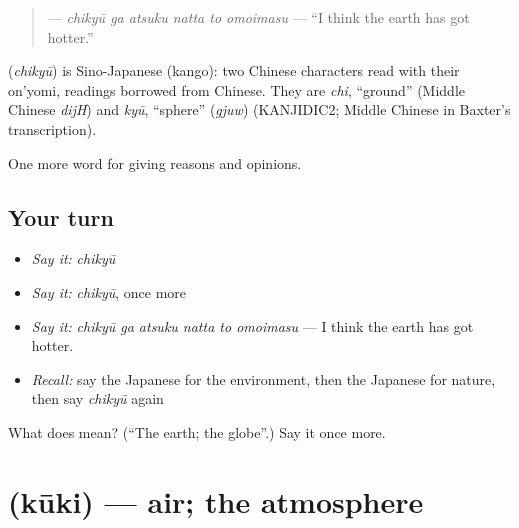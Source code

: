 \begin{quote}
\textbf{   } — \emph{chikyū ga atsuku natta to omoimasu} — \textquotedblleft{}I think the earth has got hotter.\textquotedblright{}
\end{quote}

\begin{cousinweb}
\textbf{} (\emph{chikyū}) is Sino-Japanese (kango): two Chinese characters read with their on'yomi, readings borrowed from Chinese. They are \emph{chi}, \textquotedblleft{}ground\textquotedblright{} (Middle Chinese \emph{dijH}) and \emph{kyū}, \textquotedblleft{}sphere\textquotedblright{} (\emph{gjuw}) (KANJIDIC2; Middle Chinese in Baxter's transcription).
\end{cousinweb}

\begin{grammarlens}[title={What you've built}]
One more word for giving reasons and opinions.
\end{grammarlens}

\subsection*{Your turn}
\begin{itemize}
\raggedright
  \item \emph{Say it:} \emph{chikyū}
  \item \emph{Say it:} \emph{chikyū}, once more
  \item \emph{Say it:} \emph{chikyū ga atsuku natta to omoimasu} — I think the earth has got hotter.
  \item \emph{Recall:} say the Japanese for the environment, then the Japanese for nature, then say \emph{chikyū} again
\end{itemize}

\begin{tcolorbox}[breakable,colback=teal!4,colframe=teal!35!black,title={Before you move on}]
What does  mean? (\textquotedblleft{}The earth; the globe\textquotedblright{}.) Say it once more.
\end{tcolorbox}
\section[\texorpdfstring{\ja{くうき} (kūki)}{くうき (kūki)}]{ (kūki) — air; the atmosphere}

\label{lesson:JA-C336-kuuki}




